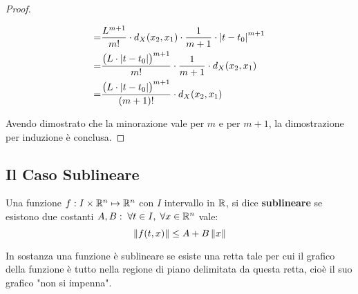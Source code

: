 \begin{theorem}
\begin{proof}
\begin{itemize}
\begin{align*}
				= &\frac{L^{m+1}}{m!} \cdot d_X(x_2,x_1)
				\cdot \frac{1}{m+1} \cdot \left|t-t_0\right|^{m+1}\\
				= &\frac{\bigl(L \cdot \left|t-t_0\right|\bigr)^{m+1}}{m!} \cdot \frac{1}{m+1} \cdot d_X(x_2,x_1)\\
				= &\frac{\bigl(L \cdot \left|t-t_0\right|\bigr)^{m+1}}{(m+1)!} \cdot d_X(x_2,x_1)\\
			\end{align*}
		\end{itemize}
		Avendo dimostrato che la minorazione vale per $m$ e per $m+1$, la dimostrazione per induzione è conclusa.
	\end{proof}
\end{theorem}

\subsection{Il Caso Sublineare}
\begin{definition}
	\label{def:sublineare}
	Una funzione $f:I\times\mathbb{R}^n\mapsto\mathbb{R}^n$ con $I$ intervallo in $\mathbb{R}$, si dice \textbf{sublineare} se esistono due costanti $A, B:\; \forall t \in I,\;\forall x \in \mathbb{R}^n$ vale:
	$$\left\|f(t,x)\right\|\leq A + B \left\|x\right\|$$
	\begin{note}
		In sostanza una funzione è sublineare se esiste una retta tale per cui il grafico della funzione è tutto nella regione di piano delimitata da questa retta, cioè il suo grafico "non si impenna".
		\begin{center}
		\end{center}
	\end{note}
\end{definition}
